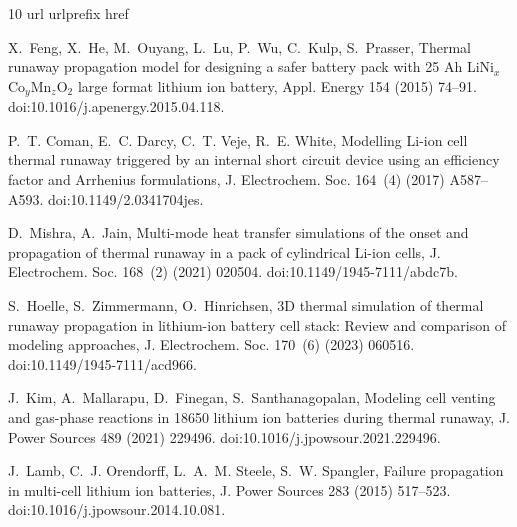 \documentclass[preprint,12pt]{elsarticle}
\begin{document}

\begin{thebibliography}{10}
\expandafter\ifx\csname url\endcsname\relax
  \def\url#1{\texttt{#1}}\fi
\expandafter\ifx\csname urlprefix\endcsname\relax\def\urlprefix{URL }\fi
\expandafter\ifx\csname href\endcsname\relax
  \def\href#1#2{#2} \def\path#1{#1}\fi

X.~Feng, X.~He, M.~Ouyang, L.~Lu, P.~Wu, C.~Kulp, S.~Prasser, Thermal runaway
  propagation model for designing a safer battery pack with 25 {Ah}
  {LiNi$_x$Co$_y$Mn$_z$O$_2$} large format lithium ion battery, Appl. Energy
  154 (2015) 74--91.
\newblock \href {https://doi.org/10.1016/j.apenergy.2015.04.118}
  {\path{doi:10.1016/j.apenergy.2015.04.118}}.

P.~T. Coman, E.~C. Darcy, C.~T. Veje, R.~E. White, Modelling {Li}-ion cell
  thermal runaway triggered by an internal short circuit device using an
  efficiency factor and {Arrhenius} formulations, J. Electrochem. Soc. 164~(4)
  (2017) A587--A593.
\newblock \href {https://doi.org/10.1149/2.0341704jes}
  {\path{doi:10.1149/2.0341704jes}}.

D.~Mishra, A.~Jain, Multi-mode heat transfer simulations of the onset and
  propagation of thermal runaway in a pack of cylindrical {Li}-ion cells, J.
  Electrochem. Soc. 168~(2) (2021) 020504.
\newblock \href {https://doi.org/10.1149/1945-7111/abdc7b}
  {\path{doi:10.1149/1945-7111/abdc7b}}.

S.~Hoelle, S.~Zimmermann, O.~Hinrichsen, {3D} thermal simulation of thermal
  runaway propagation in lithium-ion battery cell stack: Review and comparison
  of modeling approaches, J. Electrochem. Soc. 170~(6) (2023) 060516.
\newblock \href {https://doi.org/10.1149/1945-7111/acd966}
  {\path{doi:10.1149/1945-7111/acd966}}.

J.~Kim, A.~Mallarapu, D.~Finegan, S.~Santhanagopalan, Modeling cell venting and
  gas-phase reactions in 18650 lithium ion batteries during thermal runaway, J.
  Power Sources 489 (2021) 229496.
\newblock \href {https://doi.org/10.1016/j.jpowsour.2021.229496}
  {\path{doi:10.1016/j.jpowsour.2021.229496}}.

J.~Lamb, C.~J. Orendorff, L.~A.~M. Steele, S.~W. Spangler, Failure propagation
  in multi-cell lithium ion batteries, J. Power Sources 283 (2015) 517--523.
\newblock \href {https://doi.org/10.1016/j.jpowsour.2014.10.081}
  {\path{doi:10.1016/j.jpowsour.2014.10.081}}.


\end{thebibliography}
\end{document}
